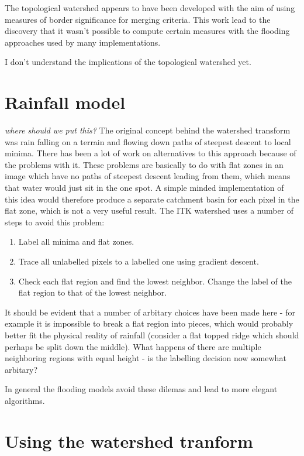\documentclass{InsightArticle}
\begin{document}
The topological watershed appears to have been developed with the aim
of using measures of border significance for merging criteria. This
work lead to the discovery that it wasn't possible to compute certain
measures with the flooding approaches used by many implementations.

I don't understand the implications of the topological watershed yet.

\section{Rainfall model}
\label{sect:rainfall}
{\em where should we put this?}  The original concept behind the
watershed transform was rain falling on a terrain and flowing down
paths of steepest descent to local minima. There has been a lot of
work on alternatives to this approach because of the problems with
it. These problems are basically to do with flat zones in an image
which have no paths of steepest descent leading from them, which means
that water would just sit in the one spot. A simple minded
implementation of this idea would therefore produce a separate
catchment basin for each pixel in the flat zone, which is not a very
useful result. The ITK watershed uses a number of steps to avoid this problem:
\begin{enumerate}
\item Label all minima and flat zones.
\item Trace all unlabelled pixels to a labelled one using gradient descent.
\item Check each flat region and find the lowest neighbor. Change the label of the flat region to that of the lowest neighbor.
\end{enumerate}
 
It should be evident that a number of arbitary choices have been made
here - for example it is impossible to break a flat region into
pieces, which would probably better fit the physical reality of
rainfall (consider a flat topped ridge which should perhaps be split
down the middle). What happens of there are multiple neighboring
regions with equal height - is the labelling decision now somewhat arbitary?

In general the flooding models avoid these dilemas and lead to more
elegant algorithms.


\section{Using the watershed tranform}
\label{sect:usingWT}
\end{document}
